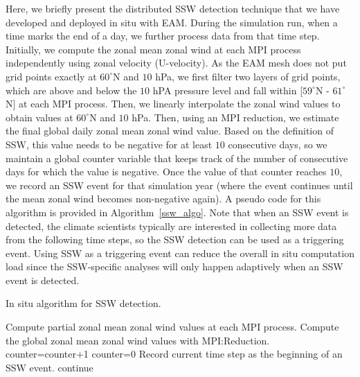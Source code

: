 \documentclass{juliacon}
\begin{document}
Here, we briefly present the distributed SSW detection technique that we have developed and deployed in situ with EAM. During the simulation run, when a time marks the end of a day, we further process data from that time step. Initially, we compute the zonal mean zonal wind at each MPI process independently using zonal velocity (U-velocity). As the EAM mesh does not put grid points exactly at $60^{\circ}$N and $10$ hPa, we first filter two layers of grid points, which are above and below the $10$ hPA pressure level and fall within [$59^{\circ}$N - $61^{\circ}$N] at each MPI process. Then, we linearly interpolate the zonal wind values to obtain values at $60^{\circ}$N and $10$ hPa. Then, using an MPI reduction, we estimate the final global daily zonal mean zonal wind value. Based on the definition of SSW, this value needs to be negative for at least $10$ consecutive days, so we maintain a global counter variable that keeps track of the number of consecutive days for which the value is negative. Once the value of that counter reaches $10$, we record an SSW event for that simulation year (where the event continues until the mean zonal wind becomes non-negative again). A pseudo code for this algorithm is provided in Algorithm~\ref{ssw_algo}. Note that when an SSW event is detected, the climate scientists typically are interested in collecting more data from the following time steps, so the SSW detection can be used as a triggering event. Using SSW as a triggering event can reduce the overall in situ computation load since the SSW-specific analyses will only happen adaptively when an SSW event is detected.


\begin{algorithm}
\caption{In situ algorithm for SSW detection.}\label{ssw_algo}
\begin{algorithmic}[1]
\Statex
{}
    \State Compute partial zonal mean zonal wind values
    \State at each MPI process.
    \State Compute the global zonal mean zonal wind
    \State values with MPI:Reduction.
    \State counter=counter+1
    \Else
    \State counter=0
    \EndIf
    \State Record current time step as the beginning of
    \State an SSW event.
    \EndIf
  \Else
    \State continue
  \EndIf
\EndFor
\end{algorithmic}
\end{algorithm}
\end{document}
